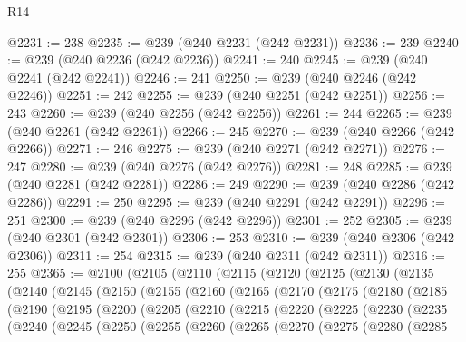 \begin{lexlean}{R14}
\begin{coremodule}
@2231 := 238
@2235 := @239 (@240 @2231 (@242 @2231))
@2236 := 239
@2240 := @239 (@240 @2236 (@242 @2236))
@2241 := 240
@2245 := @239 (@240 @2241 (@242 @2241))
@2246 := 241
@2250 := @239 (@240 @2246 (@242 @2246))
@2251 := 242
@2255 := @239 (@240 @2251 (@242 @2251))
@2256 := 243
@2260 := @239 (@240 @2256 (@242 @2256))
@2261 := 244
@2265 := @239 (@240 @2261 (@242 @2261))
@2266 := 245
@2270 := @239 (@240 @2266 (@242 @2266))
@2271 := 246
@2275 := @239 (@240 @2271 (@242 @2271))
@2276 := 247
@2280 := @239 (@240 @2276 (@242 @2276))
@2281 := 248
@2285 := @239 (@240 @2281 (@242 @2281))
@2286 := 249
@2290 := @239 (@240 @2286 (@242 @2286))
@2291 := 250
@2295 := @239 (@240 @2291 (@242 @2291))
@2296 := 251
@2300 := @239 (@240 @2296 (@242 @2296))
@2301 := 252
@2305 := @239 (@240 @2301 (@242 @2301))
@2306 := 253
@2310 := @239 (@240 @2306 (@242 @2306))
@2311 := 254
@2315 := @239 (@240 @2311 (@242 @2311))
@2316 := 255
@2365 := @2100
    (@2105
      (@2110
        (@2115
          (@2120
            (@2125
              (@2130
                (@2135
                  (@2140
                    (@2145
                      (@2150
                        (@2155
                          (@2160
                            (@2165
                              (@2170
                                (@2175
                                  (@2180
                                    (@2185
                                      (@2190
                                        (@2195
                                          (@2200
                                            (@2205
                                              (@2210
                                                (@2215
                                                  (@2220
                                                    (@2225
                                                      (@2230
                                                        (@2235
                                                          (@2240
                                                            (@2245
                                                              (@2250
                                                                (@2255
                                                                  (@2260
                                                                    (@2265
                                                                      (@2270
                                                                        (@2275
                                                                          (@2280
                                                                            (@2285

\end{coremodule}
\end{lexlean}
